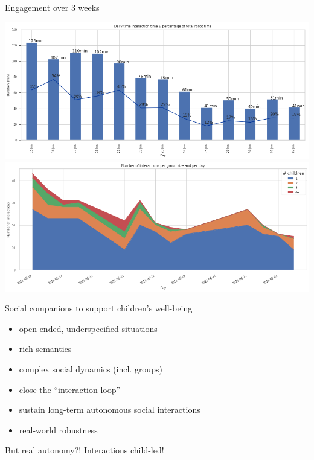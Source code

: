 \documentclass[xcolor=table]{beamer}
\begin{document}
\begin{frame}{Engagement over 3 weeks}
    \begin{center}
        \includegraphics[width=0.8\linewidth]{figs/robots4sen/fig4.png}
        \includegraphics[width=0.8\linewidth]{figs/robots4sen/fig1.2.png}
    \end{center}
\end{frame}


\begin{frame}{Social companions to support children's well-being}
\begingroup
{}
            \begin{block}{}

                \begin{itemize}
                    \item open-ended, underspecified situations
                    \item  rich semantics
                    \item  complex social dynamics (incl. groups)
                    \item  close the ``interaction loop''
                    \item  sustain long-term autonomous social interactions
                    \item  real-world robustness

                \end{itemize}
            \end{block}
\endgroup

\pause
    \begin{center}
        But real autonomy?! Interactions child-led!

    \end{center}
\end{frame}
\end{document}
